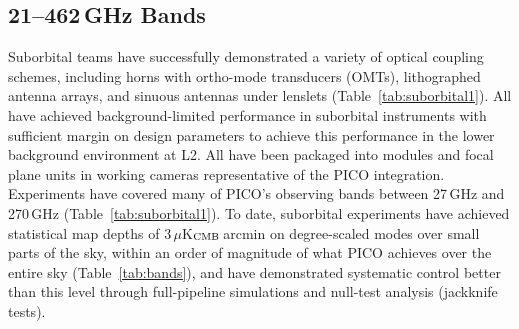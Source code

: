 




\subsection{21--462\,GHz Bands}
\label{sec:bolometers} %

Suborbital teams have successfully demonstrated a variety of optical coupling schemes, including horns with ortho-mode transducers (OMTs), lithographed antenna arrays, and sinuous antennas under lenslets (Table~\ref{tab:suborbital1}). All have achieved background-limited performance in suborbital instruments with sufficient margin on design parameters to achieve this performance in the lower background environment at L2. All have been packaged into modules and focal plane units in working cameras representative of the PICO integration. Experiments have covered many of PICO's observing bands between 27\,GHz and 270\,GHz (Table~\ref{tab:suborbital1}).  To date, suborbital experiments have achieved statistical map depths of 3\,$\mu$K$_{\rm CMB}$\,arcmin on degree-scaled modes over small parts of the sky, within an order of magnitude of what PICO achieves over the entire sky (Table~\ref{tab:bands}), and have demonstrated systematic control better than this level through full-pipeline simulations and null-test analysis (jackknife tests). 



